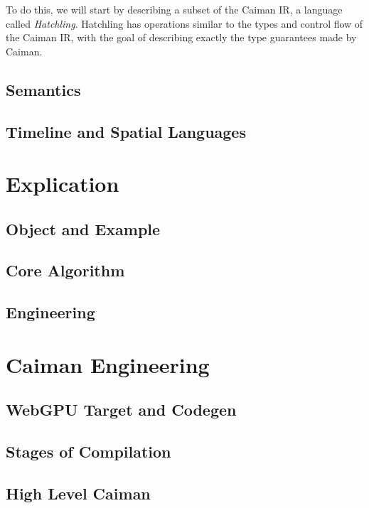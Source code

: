 To do this, we will start by describing a subset of the Caiman IR, a language called \textit{Hatchling}.  Hatchling has operations similar to the types and control flow of the Caiman IR, with the goal of describing exactly the type guarantees made by Caiman.



\subsection{Semantics}

\subsection{Timeline and Spatial Languages}

\section{Explication}

\subsection{Object and Example}

\subsection{Core Algorithm}

\subsection{Engineering}

\section{Caiman Engineering}

\subsection{WebGPU Target and Codegen}

\subsection{Stages of Compilation}

\subsection{High Level Caiman}

